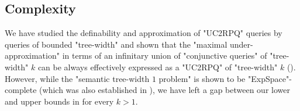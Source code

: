

\subsection{\AP{}Complexity}
\label{sec:discussion-complexity}
We have studied the definability and approximation of "UC2RPQ" queries by queries of bounded "tree-width" and shown that the "maximal under-approximation" in terms of an infinitary union of "conjunctive queries" of "tree-width" $k$ can be always effectively expressed as a "UC2RPQ"
of "tree-width" $k$ (). 
However, while the "semantic tree-width $1$ problem" is shown to be "ExpSpace"-complete (which was also established in \cite[Theorem 6.1, Proposition 6.2]{BarceloRomeroVardi2016SemanticAcyclicity}), we have left a gap between our lower and upper bounds in  for every $k>1$.

